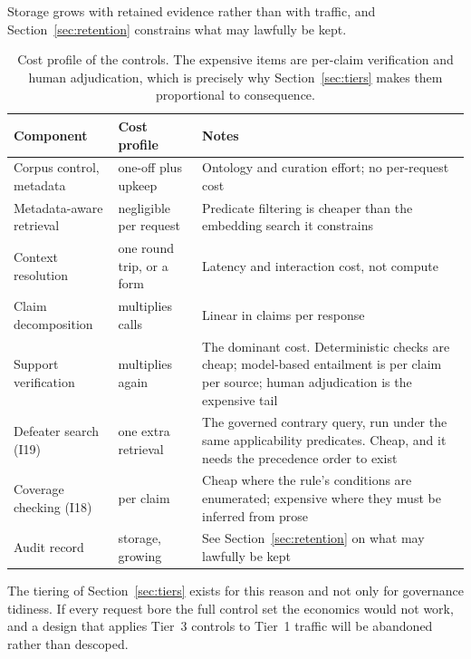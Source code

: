 \documentclass[11pt]{article}
\theoremstyle{plain}
\theoremstyle{definition}
\begin{document}
Storage grows with retained evidence rather than with traffic, and
Section~\ref{sec:retention} constrains what may lawfully be kept.

\begin{table}[ht]
  \centering
  \small
  \begin{tabular}{@{}>{\raggedright\arraybackslash}p{3.9cm}>{\raggedright\arraybackslash}p{3.1cm}>{\raggedright\arraybackslash}p{6.6cm}@{}}
    \toprule
    Component & Cost profile & Notes \\
    \midrule
    Corpus control, metadata
      & one-off plus upkeep
      & Ontology and curation effort; no per-request cost \\
    \addlinespace
    Metadata-aware retrieval
      & negligible per request
      & Predicate filtering is cheaper than the embedding search it constrains \\
    \addlinespace
    Context resolution
      & one round trip, or a form
      & Latency and interaction cost, not compute \\
    \addlinespace
    Claim decomposition
      & multiplies calls
      & Linear in claims per response \\
    \addlinespace
    Support verification
      & multiplies again
      & The dominant cost. Deterministic checks are cheap; model-based
        entailment is per claim per source; human adjudication is the expensive tail \\
    \addlinespace
    Defeater search (I19)
      & one extra retrieval
      & The governed contrary query, run under the same applicability predicates.
        Cheap, and it needs the precedence order to exist \\
    \addlinespace
    Coverage checking (I18)
      & per claim
      & Cheap where the rule's conditions are enumerated; expensive where they must be
        inferred from prose \\
    \addlinespace
    Audit record
      & storage, growing
      & See Section~\ref{sec:retention} on what may lawfully be kept \\
    \bottomrule
  \end{tabular}
  \caption{Cost profile of the controls. The expensive items are per-claim
    verification and human adjudication, which is precisely why
    Section~\ref{sec:tiers} makes them proportional to consequence.}
  \label{tab:cost}
\end{table}

The tiering of Section~\ref{sec:tiers} exists for this reason and not only for
governance tidiness. If every request bore the full control set the economics would
not work, and a design that applies Tier~3 controls to Tier~1 traffic will be
abandoned rather than descoped.
\end{document}
